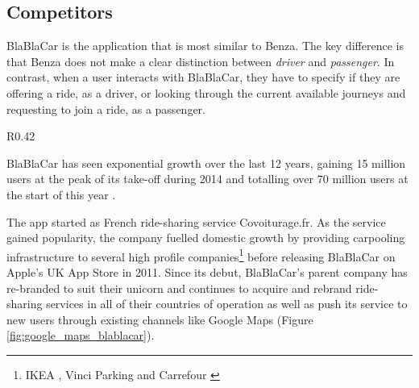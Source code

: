 \documentclass{article}
\begin{document}
    \subsection{Competitors}
    \label{subsec:competitors}
    BlaBlaCar is the application that is most similar to Benza. The key difference is that Benza does not make a clear distinction between \emph{driver} and \emph{passenger}. In contrast, when a user interacts with BlaBlaCar, they have to specify if they are offering a ride, as a driver, or looking through the current available journeys and requesting to join a ride, as a passenger. \par
    
    \begin{wrapfigure}{R}{0.42\textwidth} %
        \vspace{-5pt}
        \centering
        \caption{BlaBlaCar recommendations within Google Maps using ads \cite{romaindillet2017blablacargooglemaps}}
        \label{fig:google_maps_blablacar}
        \vspace{-10pt} %
    \end{wrapfigure}
    
    BlaBlaCar has seen exponential growth over the last 12 years, gaining 15 million users at the peak of its take-off during 2014 \cite{blablacarslideshare} and totalling over 70 million users at the start of this year \cite{romaindillet2018blablacaroptimising}. \par
    
    The \gls{app} started as French ride-sharing service Covoiturage.fr. As the service gained popularity, the company fuelled domestic growth by providing carpooling infrastructure to several high profile companies\footnote{IKEA \cite{comutoIKEAscheme}, Vinci Parking \cite[page 70]{comutoVINCIscheme} and Carrefour \cite{comutoCarrefourscheme}} before releasing BlaBlaCar on Apple's UK App Store in 2011. Since its debut, BlaBlaCar's parent company has re-branded to suit their \gls{unicorn} and continues to acquire and rebrand ride-sharing services in all of their countries of operation \cite{blablacarfinancialtimes,blablacarblogbeepcar,blablacarblogless,blablacarblogouibus} as well as push its service to new users through existing channels like Google Maps (Figure \ref{fig:google_maps_blablacar}). \par
    
\end{document}

